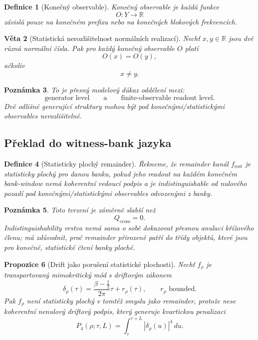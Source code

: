 \documentclass[11pt,a4paper]{article}
\newtheorem{theorem}{Věta}[section]
\newtheorem{definition}[theorem]{Definice}
\newtheorem{remark}[theorem]{Poznámka}
\newtheorem{proposition}[theorem]{Propozice}
\begin{document}
\begin{definition}[Konečný observable]
Konečný observable je každá funkce
\[
O:Y\to\mathbb R
\]
závislá pouze na konečném prefixu nebo na konečných blokových frekvencích.
\end{definition}

\begin{theorem}[Statistická nerozlišitelnost normálních realizací]
Nechť \(x,y\in\mathbb R\) jsou dvě různá normální čísla. Pak pro každý konečný observable \(O\) platí
\[
O(x)=O(y),
\]
ačkoliv
\[
x\neq y.
\]
\end{theorem}

\begin{remark}
To je přesný modelový důkaz oddělení mezi:
\[
\text{generator level}
\qquad\text{a}\qquad
\text{finite-observable readout level}.
\]
Dvě odlišné generující struktury mohou být pod konečnými/statistickými observables nerozlišitelné.
\end{remark}

\subsection*{Překlad do witness-bank jazyka}

\begin{definition}[Statisticky plochý remainder]
Řekneme, že remainder kanál \(f_{\mathrm{rest}}\) je \emph{statisticky plochý} pro danou banku,
pokud jeho readout na každém konečném bank-window nemá koherentní vedoucí podpis a je
indistinguishable od nulového pozadí pod konečnými/statistickými observables odvozenými z banky.
\end{definition}

\begin{remark}
Toto tvrzení je záměrně slabší než
\[
Q_{\mathrm{cross}}=0.
\]
Indistinguishability vrstva nemá sama o sobě dokazovat přesnou anulaci křížového členu;
má zdůvodnit, proč remainder přirozeně patří do třídy objektů, které jsou pro konečné,
statistické čtení banky ploché.
\end{remark}

\begin{proposition}[Drift jako porušení statistické plochosti]
Nechť \(f_\rho\) je transportovaný mimokritický mód s driftovým zákonem
\[
\delta_\rho(\tau)=\frac{\beta-\tfrac12}{2\pi}\tau+r_\rho(\tau),
\qquad
r_\rho \text{ bounded}.
\]
Pak \(f_\rho\) není statisticky plochý v tomtéž smyslu jako remainder, protože nese koherentní
nenulový driftový podpis, který generuje kvartickou penalizaci
\[
P_4(\rho;\tau,L)=\int_\tau^{\tau+L}|\delta_\rho(u)|^4\,du.
\]
\end{proposition}
\end{document}
